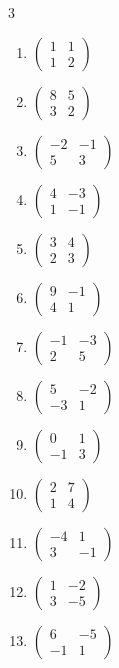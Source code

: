 \begin{multicols}{3}
\begin{enumerate}[label=\arabic*.,  leftmargin=*]
\item $\begin{pmatrix}1&1\\1&2\end{pmatrix}$
\item $\begin{pmatrix}8&5\\3&2\end{pmatrix}$
\item $\begin{pmatrix}-2&-1\\5&3\end{pmatrix}$
\item $\begin{pmatrix}4&-3\\1&-1\end{pmatrix}$
\item $\begin{pmatrix}3&4\\2&3\end{pmatrix}$
\item $\begin{pmatrix}9&-1\\4&1\end{pmatrix}$
\item $\begin{pmatrix}-1&-3\\2&5\end{pmatrix}$
\item $\begin{pmatrix}5&-2\\-3&1\end{pmatrix}$
\item $\begin{pmatrix}0&1\\-1&3\end{pmatrix}$
\item $\begin{pmatrix}2&7\\1&4\end{pmatrix}$
\item $\begin{pmatrix}-4&1\\3&-1\end{pmatrix}$
\item $\begin{pmatrix}1&-2\\3&-5\end{pmatrix}$
\item $\begin{pmatrix}6&-5\\-1&1\end{pmatrix}$

\end{enumerate}
\end{multicols}
